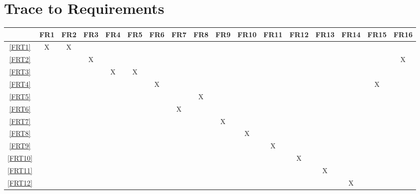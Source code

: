 \documentclass[12pt, titlepage]{article}
\begin{document}
\section{Trace to Requirements}

\setlength{\tabcolsep}{2pt}
\begin{landscape}
  \begin{table}[h!]
    \centering
    \begin{tabular}{|c|c|c|c|c|c|c|c|c|c|c|c|c|c|c|c|c|} \hline
               & FR1 & FR2 & FR3 & FR4 & FR5 & FR6 & FR7 & FR8 & FR9 & FR10 & FR11 & FR12 & FR13 & FR14 & FR15 & FR16 \\ \hline
      \ref{FRT1}  & X   & X   &     &     &     &     &     &     &     &      &      &      &      &      &      &      \\ \hline
      \ref{FRT2}  &     &     & X   &     &     &     &     &     &     &      &      &      &      &      &      & X    \\ \hline
      \ref{FRT3}  &     &     &     & X   & X   &     &     &     &     &      &      &      &      &      &      &      \\ \hline
      \ref{FRT4}  &     &     &     &     &     & X   &     &     &     &      &      &      &      &      & X    &      \\ \hline
      \ref{FRT5}  &     &     &     &     &     &     &     & X   &     &      &      &      &      &      &      &      \\ \hline
      \ref{FRT6}  &     &     &     &     &     &     & X   &     &     &      &      &      &      &      &      &      \\ \hline
      \ref{FRT7}  &     &     &     &     &     &     &     &     & X   &      &      &      &      &      &      &      \\ \hline
      \ref{FRT8}  &     &     &     &     &     &     &     &     &     & X    &      &      &      &      &      &      \\ \hline
      \ref{FRT9}  &     &     &     &     &     &     &     &     &     &      & X    &      &      &      &      &      \\ \hline
      \ref{FRT10} &     &     &     &     &     &     &     &     &     &      &      & X    &      &      &      &      \\ \hline
      \ref{FRT11} &     &     &     &     &     &     &     &     &     &      &      &      & X    &      &      &      \\ \hline
      \ref{FRT12} &     &     &     &     &     &     &     &     &     &      &      &      &      & X    &      &      \\ \hline

\end{tabular}
\end{table}
\end{landscape}
\end{document}
